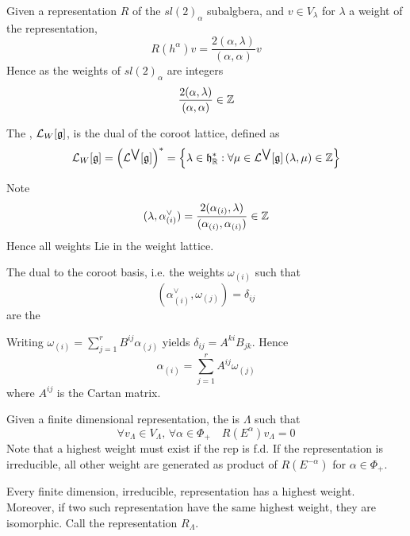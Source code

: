 \documentclass{article}
\begin{document}
\begin{definition}
Given a representation $R$ of the $sl(2)_\alpha$ subalgbera, and $v\in V_\lambda$ for $\lambda$ a weight of the representation,
\[
R(h^\alpha)v=\frac{2(\alpha,\lambda)}{(\alpha,\alpha)}v
\]
Hence as the weights of $sl(2)_\alpha$ are integers
\[
\frac{2(\alpha,\lambda)}{(\alpha,\alpha)} \in \mathbb{Z}
\]
\end{definition}

\begin{definition}
The , $\mathcal{L}_W [\mathfrak{g}]$, is the dual of the coroot lattice, defined as 
\[
\mathcal{L}_W [\mathfrak{g}] = \left( \mathcal{L}^{\bigvee} [\mathfrak{g}] \right)^\ast = \left\{ \lambda\in\mathfrak{h}^\ast_{\mathbb{R}} : \forall \mu\in\mathcal{L}^{\bigvee} [\mathfrak{g}] \, (\lambda, \mu) \in \mathbb{Z} \right\}
\]
\end{definition}

\begin{theorem}
Note 
\[
(\lambda, \alpha^\vee_{(i)})=\frac{2(\alpha_{(i)},\lambda)}{(\alpha_{(i)},\alpha_{(i)})} \in \mathbb{Z}
\]
Hence all weights Lie in the weight lattice. 
\end{theorem}

\begin{definition}
The dual to the coroot basis, i.e. the weights $\omega_{(i)}$ such that 
\[
(\alpha^\vee_{(i)}, \omega_{(j)})=\delta_{ij}
\]
are the 
\end{definition}

\begin{fact}
Writing $\omega_{(i)}=\sum_{j=1}^r B^{ij} \alpha_{(j)}$ yields $\delta_{ij}=A^{ki}B_{jk}$. Hence 
\[
\alpha_{(i)}=\sum_{j=1}^r A^{ij} \omega_{(j)}
\]
where $A^{ij}$ is the Cartan matrix. 
\end{fact}

\begin{definition}
Given a finite dimensional representation, the  is $\Lambda$ such that 
\[
\forall v_\Lambda\in V_\Lambda, \, \forall \alpha\in\Phi_+ \quad R(E^\alpha)v_\Lambda=0
\]
Note that a highest weight must exist if the rep is f.d. If the representation is irreducible, all other weight are generated as product of $R(E^{-\alpha})$ for $\alpha\in\Phi_+$. 
\end{definition}

\begin{theorem}
Every finite dimension, irreducible, representation has a highest weight. Moreover, if two such representation have the same highest weight, they are isomorphic. Call the representation $R_\Lambda$. 
\end{theorem}
\end{document}
